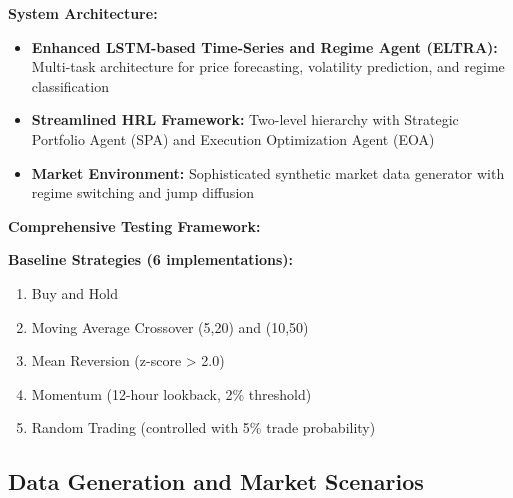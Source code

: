 \documentclass[11pt,a4paper]{article}
\begin{document}
\textbf{System Architecture:}
\begin{itemize}
\item \textbf{Enhanced LSTM-based Time-Series and Regime Agent (ELTRA):} Multi-task architecture for price forecasting, volatility prediction, and regime classification
\item \textbf{Streamlined HRL Framework:} Two-level hierarchy with Strategic Portfolio Agent (SPA) and Execution Optimization Agent (EOA)
\item \textbf{Market Environment:} Sophisticated synthetic market data generator with regime switching and jump diffusion

\end{itemize}
\textbf{Comprehensive Testing Framework:}
\textbf{Baseline Strategies (6 implementations):}
\begin{enumerate}
\item Buy and Hold
\item Moving Average Crossover (5,20) and (10,50)
\item Mean Reversion (z-score > 2.0)
\item Momentum (12-hour lookback, 2\% threshold)
\item Random Trading (controlled with 5\% trade probability)

\end{enumerate}
\subsection{Data Generation and Market Scenarios}
\end{document}
